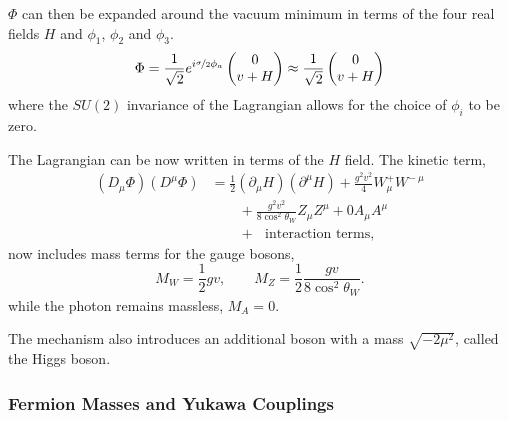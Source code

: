 $\Phi$ can then be expanded around the vacuum minimum in terms of the four real
fields $H$ and $\phi_1$, $\phi_2$ and $\phi_3$.
\begin{equation}
\label{eq:phi}
\Phi = 
\frac{1}{\sqrt{2}}
e^{i\nicefrac{\sigma}{2}\phi_a}
\left(\begin{matrix}0\\v+H\end{matrix}\right)
\approx 
\frac{1}{\sqrt{2}}
\left(\begin{matrix}0\\v+H\end{matrix}\right)
\end{equation}
where the $SU(2)$ invariance of the Lagrangian allows for the choice of $\phi_i$
to be zero\cite{halzen1984quarks,ral}.

The Lagrangian can be now written in terms of the $H$ field. The kinetic
term,\cite{ral}
\begin{align}
\left(D_{\mu}\Phi\right) \left(D^{\mu}\Phi\right) 
&= \frac{1}{2} \left(\partial_{\mu}H\right) \left(\partial^{\mu}H\right) 
         + \frac{g^{2}v^{2}}{4} W_{\mu}^{+} W^{-~\mu} \nonumber \\
&\qquad{}+ \frac{g^{2}v^{2}}{8 \cos^{2}\theta_{W}} Z_{\mu} Z^{\mu} + 0 A_{\mu} A^{\mu} \nonumber \\
&\qquad{}+ \text{~ interaction terms},
\end{align}
now includes mass terms for the gauge bosons,
\begin{equation}
M_{W} = \frac{1}{2}gv, \qquad 
M_{Z} = \frac{1}{2}\frac{gv}{8\cos^{2}\theta_{W}} .
\end{equation}
while the photon remains massless, $M_{A}=0$.

The mechanism also introduces an additional boson with a mass
$\sqrt{-2\mu^{2}}$, called the Higgs boson.

\subsubsection{Fermion Masses and Yukawa Couplings}

